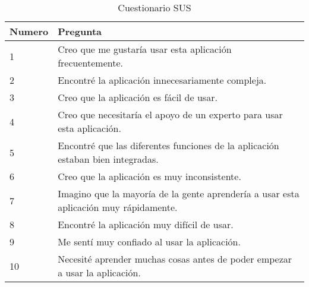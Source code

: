 
\begin{table}[H]
\centering
\label{tab:sus}
\begin{tabular}{|l|l|}
\hline
\textbf{Numero} & \textbf{Pregunta} \\ \hline
1 & Creo que me gustaría usar esta aplicación frecuentemente. \\ \hline
2 & Encontré la aplicación innecesariamente compleja. \\ \hline
3 & Creo que la aplicación es fácil de usar. \\ \hline
4 & Creo que necesitaría el apoyo de un experto para usar esta aplicación. \\ \hline
5 & Encontré que las diferentes funciones de la aplicación estaban bien integradas. \\ \hline
6 & Creo que la aplicación es muy inconsistente. \\ \hline
7 & Imagino que la mayoría de la gente aprendería a usar esta aplicación muy rápidamente. \\ \hline
8 & Encontré la aplicación muy difícil de usar. \\ \hline
9 & Me sentí muy confiado al usar la aplicación. \\ \hline
10 & Necesité aprender muchas cosas antes de poder empezar a usar la aplicación. \\ \hline
\end{tabular}
\caption{Cuestionario SUS}
\end{table}